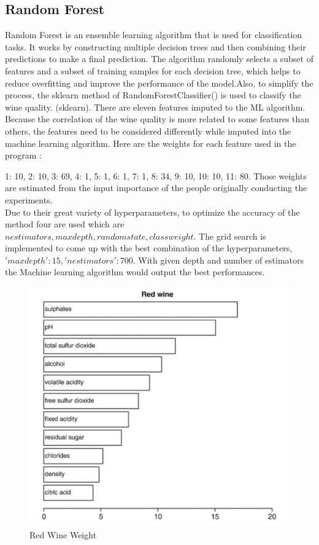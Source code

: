 \documentclass[conference]{IEEEtran}
\begin{document}
\subsection{Random Forest}
Random Forest is an ensemble learning algorithm that is used for classification tasks. It works by constructing multiple decision trees and then combining their predictions to make a final prediction. The algorithm randomly selects a subset of features and a subset of training samples for each decision tree, which helps to reduce overfitting and improve the performance of the model.Also, to simplify the process, the sklearn method of RandomForestClassifier() is used to classify the wine quality. (sklearn). There are eleven features imputed to the ML algorithm. Because the correlation of the wine quality is more related to some features than others, the features need to be considered differently while imputed into the machine learning algorithm. Here are the weights for each feature used in the program :{1: 10, 2: 10, 3: 69, 4: 1, 5: 1, 6: 1, 7: 1, 8: 34, 9: 10, 10: 10, 11: 80.  Those weights are estimated from the input importance of the people originally conducting the experiments.\\
	Due to their great variety of hyperparameters, to optimize the accuracy of the method four are used which are $n estimators, max depth, random state, class weight$. The grid search is implemented to come up with the best combination of the hyperparameters, $ 'max depth': 15, 'n estimators': 700$. With given depth and number of estimators the Machine learning algorithm would output the best performances.\\
	\begin{figure}[h]
	\label{fig:foo}
	\begin{center}
	\includegraphics[scale=0.35]{redWineWeight.png}
	\caption{Red Wine Weight}
	\end{center}
	\end{figure}\\
	
}
\end{document}

